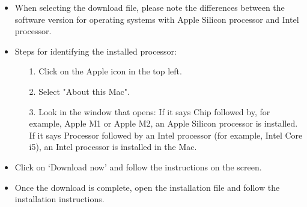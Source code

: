 \begin{itemize}
	\item When selecting the download file, please note the differences between the software version for operating systems with Apple Silicon processor and Intel processor.
	\item Steps for identifying the installed processor:
	\begin{itemize}
		\item[1.] Click on the Apple icon in the top left.
		\item[2.] Select "About this Mac".
		\item[3.] Look in the window that opens: \newline
		If it says \glqq Chip\grqq {} followed by, for example, \glqq Apple M1\grqq {} or \glqq Apple M2\grqq {}, an Apple Silicon processor is installed.\newline
		If it says \glqq Processor\grqq {} followed by an Intel processor (for example, \glqq Intel Core i5\grqq {}), an Intel processor is installed in the Mac.
	\end{itemize}
		\item Click on ‘Download now’ and follow the instructions on the screen.
	\item Once the download is complete, open the installation file and follow the installation instructions.
\end{itemize}

